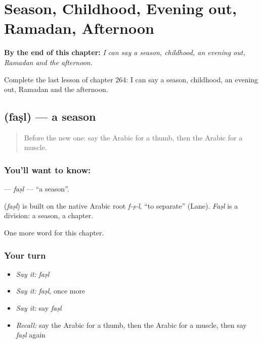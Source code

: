 
\chapter{Season, Childhood, Evening out, Ramadan, Afternoon}
\label{ch:ar-season-childhood-evening-out-ramadan-afternoon}

\begin{chapteropening}
\textbf{By the end of this chapter:} \emph{I can say a season, childhood, an evening out, Ramadan and the afternoon.}

Complete the last lesson of chapter 264: I can say a season, childhood, an evening out, Ramadan and the afternoon.
\end{chapteropening}

\section[\texorpdfstring{\ar{فصل} (faṣl)}{فصل (faṣl)}]{ (faṣl) — a season}

\label{lesson:AR-C264-fasl}



\begin{quote}
Before the new one: say the Arabic for a thumb, then the Arabic for a muscle.
\end{quote}

\subsection*{You'll want to know: }
\textbf{} — \emph{faṣl} — \textquotedblleft{}a season\textquotedblright{}.

\begin{cousinweb}
\textbf{} (\emph{faṣl}) is built on the native Arabic root \emph{f-ṣ-l}, \textquotedblleft{}to separate\textquotedblright{} (Lane). \emph{Faṣl} is a division: a season, a chapter.
\end{cousinweb}

\begin{grammarlens}[title={What you've built}]
One more word for this chapter.
\end{grammarlens}

\subsection*{Your turn}
\begin{itemize}
\raggedright
  \item \emph{Say it:} \emph{faṣl}
  \item \emph{Say it:} \emph{faṣl}, once more
  \item \emph{Say it:} say \emph{faṣl}
  \item \emph{Recall:} say the Arabic for a thumb, then the Arabic for a muscle, then say \emph{faṣl} again
\end{itemize}

